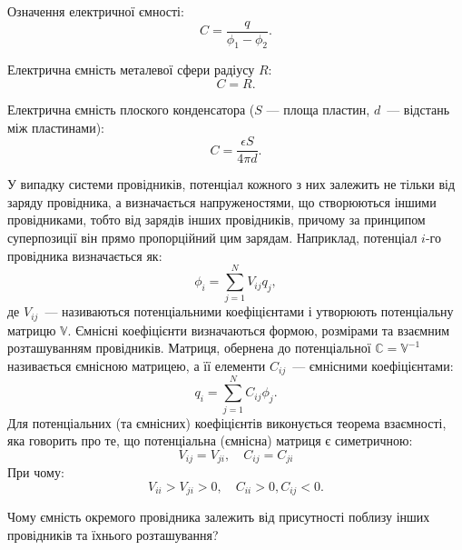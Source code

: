 \begin{Theory}\small
	Означення електричної ємності:
	\begin{equation}\label{capacity}
		C = \frac{q}{\phi_1 - \phi_2}.
	\end{equation}
	
	Електрична ємність металевої сфери радіусу $R$:
	\begin{equation}\label{sphere_capacity}
		C = R.
	\end{equation}
	
	Електрична ємність плоского конденсатора ($S$ --- площа пластин, $d$~--- відстань між пластинами):
	\begin{equation}\label{condensator_capacity}
	C = \frac{\epsilon S}{4\pi d}.
	\end{equation}
	
	У випадку системи провідників, потенціал кожного з них залежить не тільки від заряду провідника, а визначається напруженостями, що створюються іншими провідниками, тобто від зарядів інших провідників, причому за принципом суперпозиції він прямо пропорційний цим зарядам. Наприклад, потенціал $i$-го провідника визначається як:
	\begin{equation}
		\phi_i = \sum\limits_{j=1}^{N}V_{ij} q_j,
	\end{equation}
	де $V_{ij}$~--- називаються потенціальними коефіцієнтами і утворюють потенціальну матрицю $\mathbb{V}$. Ємнісні коефіцієнти визначаються формою, розмірами та взаємним розташуванням провідників. Матриця, обернена до потенціальної $\mathbb{C} = \mathbb{V}^{-1}$ називається ємнісною матрицею, а її елементи $C_{ij}$~--- ємнісними коефіцієнтами:
	\begin{equation}\label{}
		q_i = \sum\limits_{j=1}^{N}C_{ij} \phi_j.
	\end{equation}
	Для потенціальних (та ємнісних) коефіцієнтів виконується теорема взаємності, яка говорить про те, що потенціальна (ємнісна) матриця є симетричною:
	\begin{equation*}\label{}
		V_{ij} = V_{ji}, \quad C_{ij} = C_{ji}
	\end{equation*}
	При чому:
	\begin{equation}\label{}
			V_{ii} > V_{ji} > 0, \quad C_{ii} >0, C_{ij}<0.
	\end{equation}
\end{Theory}

\begin{problem}
    Чому ємність окремого провідника залежить від присутності поблизу інших провідників та їхнього розташування?

\end{problem}

